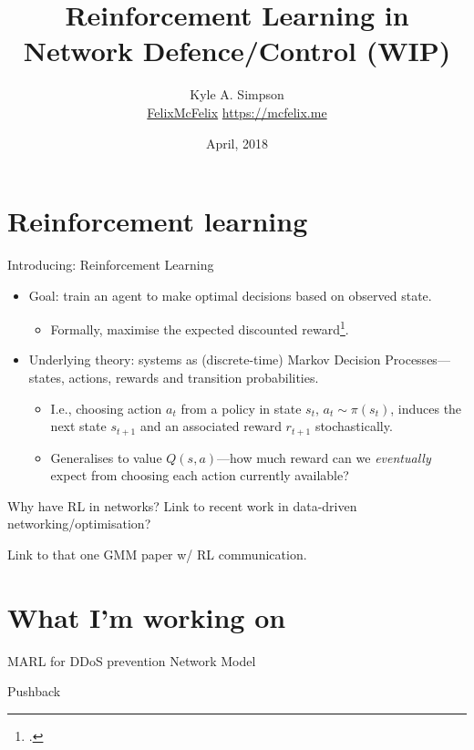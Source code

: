 \documentclass[aspectratio=169,xcolor={dvipsnames}
,hide notes
]{beamer}
\title{Reinforcement Learning in Network Defence/Control (WIP)}
\author{Kyle A. Simpson\\
	\small{\faGithub{} \href{https://github.com/felixmcfelix}{FelixMcFelix} \hspace{0.5em} \faGlobe{} \url{https://mcfelix.me}}}
\institute{University of Glasgow}
\date{\nth{10} April, 2018}
\begin{document}
\maketitle

\section{Reinforcement learning}

\begin{frame}{Introducing: Reinforcement Learning}
	\begin{itemize}
		\item Goal: train an agent to make optimal decisions based on observed state.
		\begin{itemize}
			\item Formally, maximise the \alert{expected discounted reward}\footcite{RL2E}.
		\end{itemize}
	
		\item Underlying theory: systems as (discrete-time) \alert{Markov Decision Processes}---states, actions, rewards and transition probabilities.
		\begin{itemize}
			\item I.e., choosing action $a_t$ from a policy in state $s_t$, $a_t \sim \pi(s_t)$, induces the next state $s_{t+1}$ and an associated reward $r_{t+1}$ stochastically.
			\item Generalises to \alert{value} $Q(s,a)$---how much reward can we \emph{eventually} expect from choosing each action currently available?
		\end{itemize}
	\end{itemize}
\end{frame}

\begin{frame}{Why have RL in networks?}
	Link to recent work in data-driven networking/optimisation?
	
	Link to that one GMM paper w/ RL communication.
\end{frame}

\section{What I'm working on}

\begin{frame}{MARL for DDoS prevention}
	Network Model
	
	Pushback
\end{frame}
\end{document}
